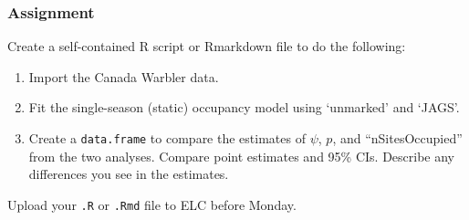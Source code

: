 \documentclass[color=usenames,dvipsnames]{beamer}\usepackage[]{graphicx}\usepackage[]{color}
\newcommand{\inr}[1]{\colorbox{inlinecolor}{\texttt{#1}}}
\begin{document}
\begin{frame}
  \frametitle{Assignment}
  \small
  Create a self-contained R script or Rmarkdown file
  to do the following:
  \begin{enumerate}
    \small
    \item Import the Canada Warbler data. %
    \item Fit the single-season (static) occupancy model using
      `unmarked' and `JAGS'. 
    \item Create a \inr{data.frame} to compare the estimates of
      $\psi$, $p$, and ``nSitesOccupied'' from the two
      analyses. Compare point estimates and 95\% CIs. Describe any
      differences you see in the estimates.
  \end{enumerate}
  Upload your {\tt .R} or {\tt .Rmd} file to ELC before Monday. 
\end{frame}
\end{document}
